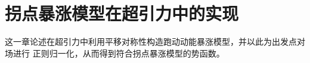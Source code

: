\chapter{拐点暴涨模型在超引力中的实现}%
\label{chap:inflection_model}
这一章论述在超引力中利用平移对称性构造跑动动能暴涨模型，并以此为出发点对场进行
正则归一化，从而得到符合拐点暴涨模型的势函数。




